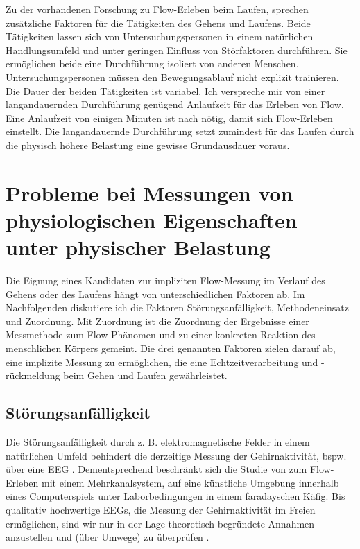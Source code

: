 Zu der vorhandenen Forschung zu Flow-Erleben beim Laufen, sprechen zusätzliche Faktoren für die Tätigkeiten des Gehens und Laufens. Beide Tätigkeiten lassen sich von Untersuchungspersonen in einem natürlichen Handlungsumfeld und unter geringen Einfluss von Störfaktoren durchführen. Sie ermöglichen beide eine Durchführung isoliert von anderen Menschen. Untersuchungspersonen müssen den Bewegungsablauf nicht explizit trainieren. Die Dauer der beiden Tätigkeiten ist variabel. Ich verspreche mir von einer langandauernden Durchführung genügend Anlaufzeit für das Erleben von Flow. Eine Anlaufzeit von einigen Minuten ist nach \citet[S.~109]{Henk2014} nötig, damit sich Flow-Erleben einstellt. Die langandauernde Durchführung setzt zumindest für das Laufen durch die physisch höhere Belastung eine gewisse Grundausdauer voraus.

\section{Probleme bei Messungen von physiologischen Eigenschaften unter physischer Belastung}
\label{sec:probleme_bei_messungen}
Die Eignung eines Kandidaten zur impliziten Flow-Messung im Verlauf des Gehens oder des Laufens hängt von unterschiedlichen Faktoren ab. Im Nachfolgenden diskutiere ich die Faktoren Störungsanfälligkeit, Methodeneinsatz und Zuordnung. Mit Zuordnung ist die Zuordnung der Ergebnisse einer Messmethode zum Flow-Phänomen und zu einer konkreten Reaktion des menschlichen Körpers gemeint. Die drei genannten Faktoren zielen darauf ab, eine implizite Messung zu ermöglichen, die eine Echtzeitverarbeitung und -rückmeldung beim Gehen und Laufen gewährleistet.

\subsection{Störungsanfälligkeit}
Die Störungsanfälligkeit durch z. B. elektromagnetische Felder in einem natürlichen Umfeld behindert die derzeitige Messung der Gehirnaktivität, bspw. über eine \ac{EEG} \citep[vgl.][S.~56]{Henk2014}. Dementsprechend beschränkt sich die Studie von \citet{Hugentobler2011} zum Flow-Erleben mit einem Mehrkanalsystem, auf eine künstliche Umgebung innerhalb eines Computerspiels unter Laborbedingungen in einem faradayschen Käfig. Bis qualitativ hochwertige \acp{EEG}, die Messung der Gehirnaktivität im Freien ermöglichen, sind wir nur in der Lage theoretisch begründete Annahmen anzustellen und (über Umwege) zu überprüfen \citep[vgl.][S.~56]{Henk2014}.

